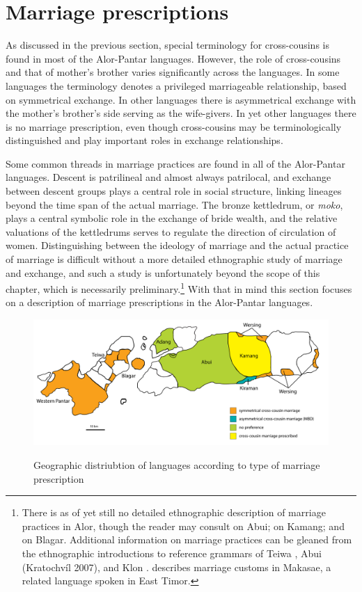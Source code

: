 \section{Marriage prescriptions}
As discussed in the previous section, special terminology for cross-cousins is found in most of the Alor-Pantar languages. However, the role of cross-cousins and that of mother's brother varies significantly across the languages. In some languages the terminology denotes a privileged marriageable relationship, based on symmetrical exchange. In other languages there is asymmetrical exchange with the mother's brother's side serving as the wife-givers. In yet other languages there is no marriage prescription, even though cross-cousins may be terminologically distinguished and  play important roles in exchange relationships. 

Some common threads in marriage practices are found in all of the Alor-Pantar languages. Descent is patrilineal and almost always patrilocal, and exchange between descent groups plays a central role in social structure, linking lineages beyond the time span of the actual marriage. The bronze kettledrum, or \textit{moko}, plays a central symbolic role in the exchange of bride wealth, and the relative valuations of the kettledrums serves to regulate the direction of circulation of women. Distinguishing between the ideology of marriage and the actual practice of marriage is difficult without a more detailed ethnographic study of marriage and exchange, and such a study is unfortunately beyond the scope of this chapter, which is necessarily preliminary.\footnote{{ }  There is as of yet still no detailed ethnographic description of marriage practices in Alor, though the reader may consult \citet{Nicolspeyer1940} on Abui; \citet{Stokhof1977} on Kamang; and \citet{Steinhauer2010} on Blagar. Additional information on marriage practices can be gleaned from the ethnographic introductions to reference grammars of Teiwa \citep{Klamer2010}, Abui (Kratochv\'il 2007), and Klon \citep{Baird2008}. \citet{Forman1980} describes marriage customs in Makasae, a related language spoken in East Timor.} With that in mind this section focuses on a description of marriage prescriptions in the Alor-Pantar languages. 

\begin{figure}\centering
\includegraphics[width=\textwidth]{figures/Holton_ch5_fig16.pdf}
\label{fig_marriage_systems}
\caption{Geographic distriubtion of languages according to type of marriage prescription}
\end{figure}

